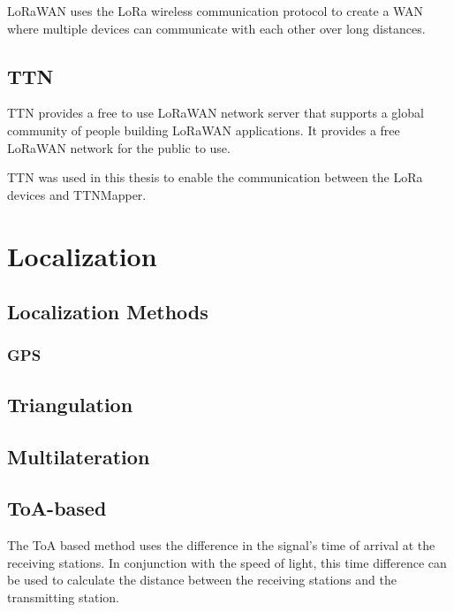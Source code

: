 \ac{LoRaWAN} uses the LoRa wireless communication protocol to create a \ac{WAN} where multiple devices can communicate with each other over long distances.

\subsection{\acf{TTN}}

\ac{TTN} provides a free to use LoRaWAN network server that supports a global community of people building \ac{LoRaWAN} applications.
It provides a free \ac{LoRaWAN} network for the public to use.

\ac{TTN} was used in this thesis to enable the communication between the \ac{LoRa} devices and TTNMapper.


\section{Localization}

\subsection{Localization Methods}



\subsubsection{\ac{GPS}}


\subsection{Triangulation}

\subsection{Multilateration}

\subsection{\acs{ToA}-based}

The \acf{ToA} based method uses the difference in the signal's time of arrival at the receiving stations.
In conjunction with the speed of light, this time difference can be used to calculate the distance between the receiving stations and the transmitting station.

